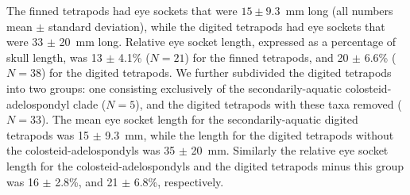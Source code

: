  The finned tetrapods had eye sockets that were $15 \pm 9.3$~mm long (all numbers mean $\pm$ standard deviation), while the digited tetrapods had eye sockets that were 33 $\pm$ 20~mm long. Relative eye socket length, expressed as a percentage of skull length, was 13 $\pm$ 4.1\% ($N=21$) for the finned tetrapods, and 20 $\pm$  6.6\% ($N=38$) for the digited tetrapods. We further subdivided the digited tetrapods into two groups: one consisting exclusively of the secondarily-aquatic colosteid-adelospondyl clade ($N=5$), and the digited tetrapods with these taxa removed ($N=33$). The mean eye socket length for the secondarily-aquatic digited tetrapods was 15 $\pm$ 9.3~mm, while the length for the digited tetrapods without the colosteid-adelospondyls was 35 $\pm$ 20~mm. Similarly the relative eye socket length for the colosteid-adelospondyls and the digited tetrapods minus this group was 16 $\pm$ 2.8\%, and 21 $\pm$ 6.8\%, respectively.